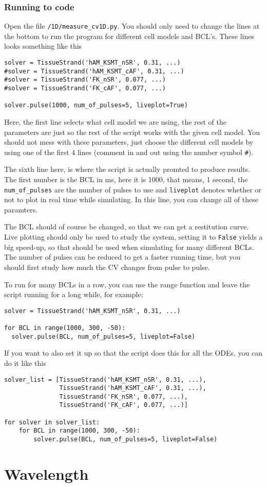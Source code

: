 \documentclass[a4paper, 11pt, notitlepage, english]{article}
\begin{document}
\subsubsection*{Running to code}

Open the file \verb!/1D/measure_cv1D.py!. You should only need to change the lines at the bottom to run the program for different cell models and BCL's. These lines looks something like this
\begin{lstlisting}
solver = TissueStrand('hAM_KSMT_nSR', 0.31, ...)
#solver = TissueStrand('hAM_KSMT_cAF', 0.31, ...)
#solver = TissueStrand('FK_nSR', 0.077, ...)
#solver = TissueStrand('FK_cAF', 0.077, ...)

solver.pulse(1000, num_of_pulses=5, liveplot=True)
\end{lstlisting}

Here, the first line selects what cell model we are using, the rest of the parameters are just so the rest of the script works with the given cell model. You should not mess with these parameters, just choose the different cell models by using one of the first 4 lines (comment in and out using the number symbol \verb+#+).

The sixth line here, is where the script is actually promted to produce results. The first number is the BCL in ms, here it is 1000, that means, 1 second, the \verb+num_of_pulses+ are the number of pulses to use and \verb+liveplot+ denotes whether or not to plot in real time while simulating. In this line, you can change all of these paramters.

The BCL should of course be changed, so that we can get a restitution curve. Live plotting should only be used to study the system, setting it to \verb+False+ yields a big speed-up, so that should be used when simulating for many different BCLs. The number of pulses can be reduced to get a faster running time, but you should first study how much the CV changes from pulse to pulse.

To run for many BCLs in a row, you can use the range function and leave the script running for a long while, for example:
\begin{lstlisting}
solver = TissueStrand('hAM_KSMT_nSR', 0.31, ...)

for BCL in range(1000, 300, -50):
  solver.pulse(BCL, num_of_pulses=5, liveplot=False)
\end{lstlisting}

If you want to also set it up so that the script does this for all the ODEs, you can do it like this
\begin{lstlisting}
solver_list = [TissueStrand('hAM_KSMT_nSR', 0.31, ...),
               TissueStrand('hAM_KSMT_cAF', 0.31, ...),
               TissueStrand('FK_nSR', 0.077, ...),
               TissueStrand('FK_cAF', 0.077, ...)]

for solver in solver_list:  
    for BCL in range(1000, 300, -50):
        solver.pulse(BCL, num_of_pulses=5, liveplot=False)
\end{lstlisting}

\clearpage

\section*{Wavelength}
\end{document}
